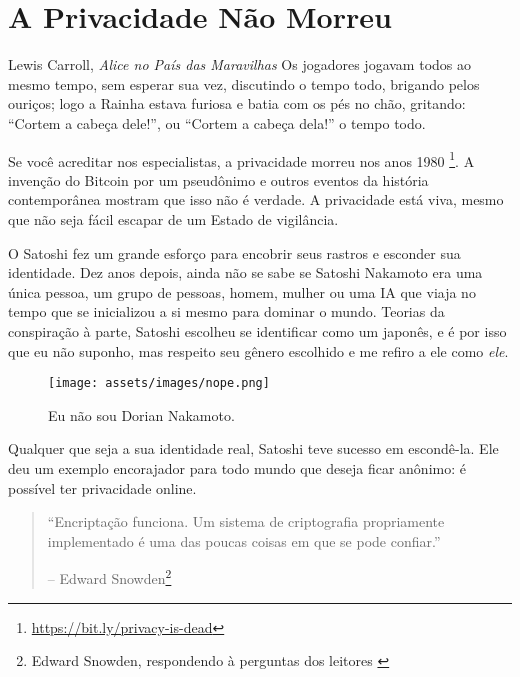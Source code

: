 \chapter{A Privacidade Não Morreu}
\label{les:19}

\begin{chapquote}{Lewis Carroll, \textit{Alice no País das Maravilhas}}
	Os jogadores jogavam todos ao mesmo tempo, sem esperar sua vez, discutindo o tempo todo, brigando pelos ouriços; logo a Rainha estava furiosa e batia com os pés no chão, gritando: \enquote{Cortem a cabeça dele!}, ou \enquote{Cortem a cabeça dela!} o tempo todo.
\end{chapquote}

Se você acreditar nos especialistas, a privacidade morreu nos anos 1980
\footnote{\url{https://bit.ly/privacy-is-dead}}. A invenção do Bitcoin por um 
pseudônimo e outros eventos da história contemporânea mostram que isso não é verdade.
A privacidade está viva, mesmo que não seja fácil escapar de um Estado de vigilância. 

O Satoshi fez um grande esforço para encobrir seus rastros e esconder
sua identidade. Dez anos depois, ainda não se sabe se Satoshi Nakamoto era uma única pessoa, um grupo de pessoas, homem, mulher ou uma IA que viaja no tempo que se 
inicializou a si mesmo para dominar o mundo. Teorias da conspiração à parte, Satoshi 
escolheu se identificar como um japonês, e é por isso que eu não suponho, mas respeito seu 
gênero escolhido e me refiro a ele como \textit{ele}. 

\begin{figure}
  \texttt{[image: assets/images/nope.png]}
  \caption{Eu não sou Dorian Nakamoto.}
  \label{fig:nope}
\end{figure}

Qualquer que seja a sua identidade real, Satoshi teve sucesso em escondê-la. 
Ele deu um exemplo encorajador para todo mundo que deseja ficar anônimo: 
é possível ter privacidade online.

\begin{quotation}\begin{samepage}
\enquote{Encriptação funciona. Um sistema de criptografia propriamente implementado é 
	uma das poucas coisas em que se pode confiar.}
\begin{flushright} -- Edward Snowden\footnote{Edward Snowden, respondendo à perguntas dos leitores \cite{snowden}}
\end{flushright}\end{samepage}\end{quotation}


